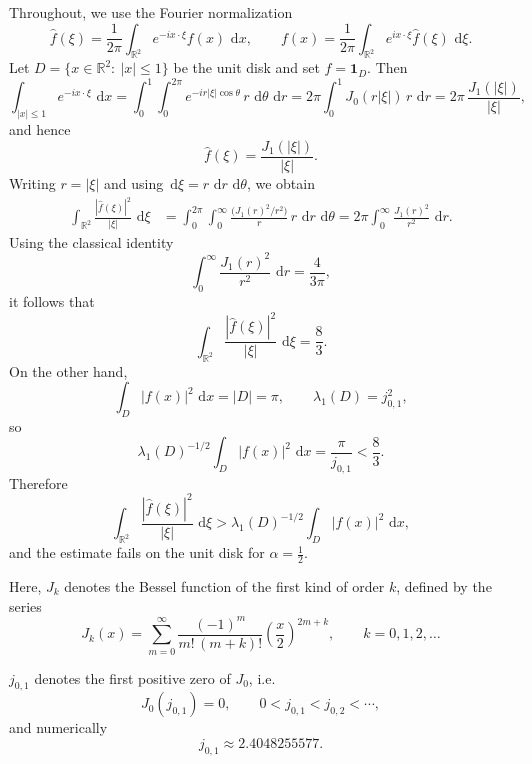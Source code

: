 \documentclass{amsart}
\newcommand{\R}{\mathbb{R}}
\newcommand{\dd}{\,\mathrm{d}}
\newcommand{\abs}[1]{\left|#1\right|}
\theoremstyle{plain}
\theoremstyle{remark}
\begin{document}
Throughout, we use the Fourier normalization
\[
\widehat f(\xi)=\frac1{2\pi}\int_{\R^2}e^{-ix\cdot\xi}f(x)\,\dd x,
\qquad
f(x)=\frac1{2\pi}\int_{\R^2}e^{ix\cdot\xi}\widehat f(\xi)\,\dd\xi .
\]
Let $D=\{x\in\R^2:\ |x|\le 1\}$ be the unit disk and set $f=\mathbf 1_D$.
Then
\[
\int_{|x|\le 1} e^{-i x\cdot \xi}\,\dd x
= \int_0^1\int_0^{2\pi} e^{-i r|\xi|\cos\theta}\,r\,\dd\theta\,\dd r
= 2\pi\int_0^1 J_0(r|\xi|)\,r\,\dd r
= 2\pi\,\frac{J_1(|\xi|)}{|\xi|},
\]
and hence
\begin{equation}\label{eq:ft-indicator}
\widehat f(\xi)=\frac{J_1(|\xi|)}{|\xi|}.
\end{equation}
Writing $r=|\xi|$ and using $\dd\xi=r\,\dd r\,\dd\theta$, we obtain
\begin{align}\label{eq:LHS2}
\int_{\R^2}\frac{\abs{\widehat f(\xi)}^2}{|\xi|}\,\dd\xi
&=\int_0^{2\pi}\int_0^\infty
\frac{\big(J_1(r)^2/r^2\big)}{r}\,r\,\dd r\,\dd\theta
=2\pi\int_0^\infty \frac{J_1(r)^2}{r^2}\,\dd r.
\end{align}
Using the classical identity
\[
\int_0^\infty \frac{J_1(r)^2}{r^2}\,\dd r=\frac{4}{3\pi},
\]
it follows that
\begin{equation}\label{eq:LHS}
\int_{\R^2}\frac{\abs{\widehat f(\xi)}^2}{|\xi|}\,\dd\xi=\frac{8}{3}.
\end{equation}
On the other hand,
\[
\int_D |f(x)|^2\,\dd x = |D|=\pi,
\qquad
\lambda_1(D)=j_{0,1}^2,
\]
so
\begin{equation}\label{eq:RHS}
\lambda_1(D)^{-1/2}\int_D |f(x)|^2\,\dd x
=\frac{\pi}{j_{0,1}}<\frac{8}{3}.
\end{equation}
Therefore
\[
\int_{\R^2}\frac{\abs{\widehat f(\xi)}^2}{|\xi|}\,\dd\xi
>\lambda_1(D)^{-1/2}\int_D \abs{f(x)}^2\,\dd x,
\]
and the estimate \cite[Lemma~2.2]{Dostanic1996}  fails on the unit disk for $\alpha=\tfrac12$.

Here, \(J_k\) denotes the Bessel function of the first kind of order \(k\), defined by the series
\[
J_k(x)=\sum_{m=0}^{\infty}\frac{(-1)^m}{m!\,(m+k)!}\left(\frac{x}{2}\right)^{2m+k},
\qquad k=0,1,2,\dots
\]


\(j_{0,1}\) denotes the first positive zero of \(J_0\), i.e.
\[
J_0\!\left(j_{0,1}\right)=0, \qquad 0<j_{0,1}<j_{0,2}<\cdots,
\]
and numerically
\[
j_{0,1}\approx 2.4048255577.
\]
\end{document}
